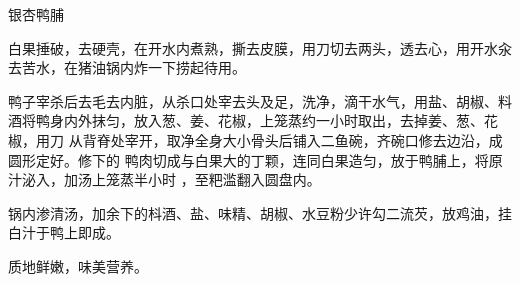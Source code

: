 \begin{recipe}{银杏鸭脯}

\ingredients



\cooking

\step 白果捶破，去硬壳，在开水内煮熟，撕去皮膜，用刀切去两头，透去心，用开水汆
去苦水，在猪油锅内炸一下捞起待用。

\step 鸭子宰杀后去毛去内脏，从杀口处宰去头及足，洗净，滴干水气，用盐、胡椒、料
酒将鸭身内外抹匀，放入葱、姜、花椒，上笼蒸约一小时取出，去掉姜、葱、花椒，用刀
从背脊处宰开，取净全身大小骨头后铺入二鱼碗，齐碗口修去边沿，成圆形定好。修下的
鸭肉切成与白果大的丁颗，连同白果造匀，放于鸭脯上，将原汁泌入，加汤上笼蒸半小时
，至粑滥翻入圆盘内。

\step 锅内渗清汤，加余下的枓酒、盐、味精、胡椒、水豆粉少许勾二流芡，放鸡油，挂
白汁于鸭上即成。

\notes

质地鲜嫩，味美营养。

\end{recipe}

